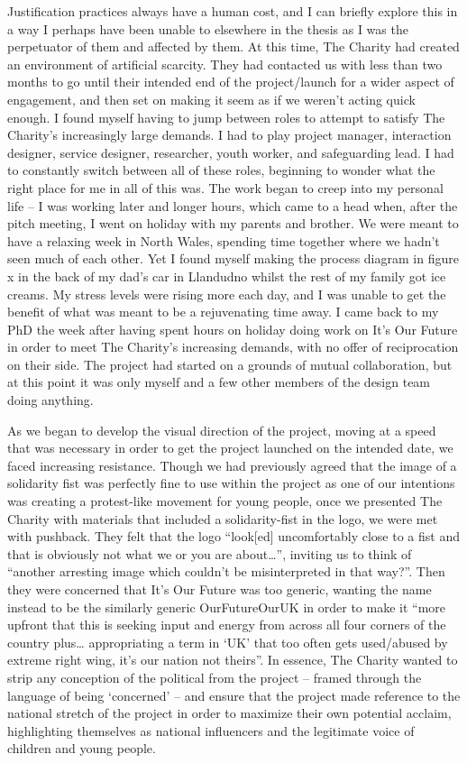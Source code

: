 Justification practices always have a human cost, and I can briefly explore this in a way I perhaps have been unable to elsewhere in the thesis as I was the perpetuator of them and affected by them. At this time, The Charity had created an environment of artificial scarcity. They had contacted us with less than two months to go until their intended end of the project/launch for a wider aspect of engagement, and then set on making it seem as if we weren’t acting quick enough. I found myself having to jump between roles to attempt to satisfy The Charity’s increasingly large demands. I had to play project manager, interaction designer, service designer, researcher, youth worker, and safeguarding lead. I had to constantly switch between all of these roles, beginning to wonder what the right place for me in all of this was. The work began to creep into my personal life – I was working later and longer hours, which came to a head when, after the pitch meeting, I went on holiday with my parents and brother. We were meant to have a relaxing week in North Wales, spending time together where we hadn’t seen much of each other. Yet I found myself making the process diagram in figure x in the back of my dad’s car in Llandudno whilst the rest of my family got ice creams. My stress levels were rising more each day, and I was unable to get the benefit of what was meant to be a rejuvenating time away. I came back to my PhD the week after having spent hours on holiday doing work on It’s Our Future in order to meet The Charity’s increasing demands, with no offer of reciprocation on their side. The project had started on a grounds of mutual collaboration, but at this point it was only myself and a few other members of the design team doing anything.

As we began to develop the visual direction of the project, moving at a speed that was necessary in order to get the project launched on the intended date, we faced increasing resistance. Though we had previously agreed that the image of a solidarity fist was perfectly fine to use within the project as one of our intentions was creating a protest-like movement for young people, once we presented The Charity with materials that included a solidarity-fist in the logo, we were met with pushback. They felt that the logo “look[ed] uncomfortably close to a fist and that is obviously not what we or you are about…”, inviting us to think of “another arresting image which couldn’t be misinterpreted in that way?”. Then they were concerned that It’s Our Future was too generic, wanting the name instead to be the similarly generic OurFutureOurUK in order to make it “more upfront that this is seeking input and energy from across all four corners of the country plus… appropriating a term in ‘UK’ that too often gets used/abused by extreme right wing, it’s our nation not theirs”. In essence, The Charity wanted to strip any conception of the political from the project – framed through the language of being ‘concerned’ – and ensure that the project made reference to the national stretch of the project in order to maximize their own potential acclaim, highlighting themselves as national influencers and the legitimate voice of children and young people.


